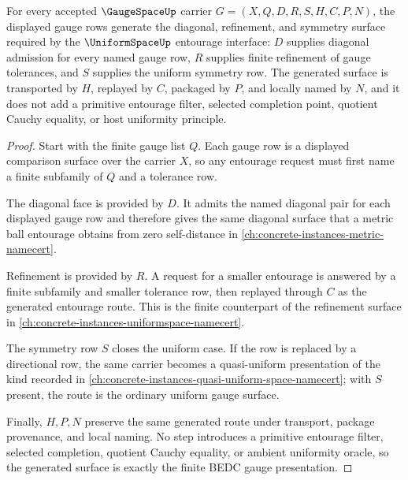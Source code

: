 \begin{theorem}
\label{thm:gauge-space-entourage-generation}
For every accepted $\GaugeSpaceUp$ carrier $G=(X,Q,D,R,S,H,C,P,N)$, the displayed gauge rows generate the diagonal, refinement, and symmetry surface required by the $\UniformSpaceUp$ entourage interface: $D$ supplies diagonal admission for every named gauge row, $R$ supplies finite refinement of gauge tolerances, and $S$ supplies the uniform symmetry row. The generated surface is transported by $H$, replayed by $C$, packaged by $P$, and locally named by $N$, and it does not add a primitive entourage filter, selected completion point, quotient Cauchy equality, or host uniformity principle.
\end{theorem}
\begin{proof}
Start with the finite gauge list $Q$. Each gauge row is a displayed comparison surface over the carrier $X$, so any entourage request must first name a finite subfamily of $Q$ and a tolerance row.

The diagonal face is provided by $D$. It admits the named diagonal pair for each displayed gauge row and therefore gives the same diagonal surface that a metric ball entourage obtains from zero self-distance in \autoref{ch:concrete-instances-metric-namecert}.

Refinement is provided by $R$. A request for a smaller entourage is answered by a finite subfamily and smaller tolerance row, then replayed through $C$ as the generated entourage route. This is the finite counterpart of the refinement surface in \autoref{ch:concrete-instances-uniformspace-namecert}.

The symmetry row $S$ closes the uniform case. If the row is replaced by a directional row, the same carrier becomes a quasi-uniform presentation of the kind recorded in \autoref{ch:concrete-instances-quasi-uniform-space-namecert}; with $S$ present, the route is the ordinary uniform gauge surface.

Finally, $H,P,N$ preserve the same generated route under transport, package provenance, and local naming. No step introduces a primitive entourage filter, selected completion, quotient Cauchy equality, or ambient uniformity oracle, so the generated surface is exactly the finite BEDC gauge presentation.
\end{proof}

